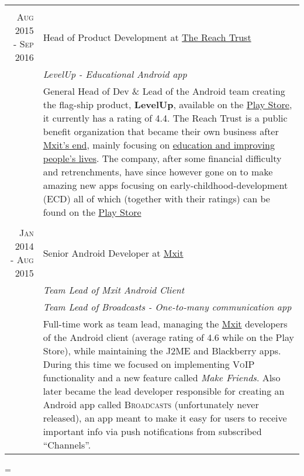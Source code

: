 \documentclass[a4paper,10pt,notitlepage]{article}
\newenvironment{absolutelynopagebreak}
  {\par\nobreak\vfil\penalty0\vfilneg
   \vtop\bgroup}
  {\par\xdef\tpd{\the\prevdepth}\egroup
   \prevdepth=\tpd}
\begin{document}
\begin{absolutelynopagebreak}
\begin{tabular}{r|p{11cm}}
		\multicolumn{2}{c}{} \\
		\textsc{Aug 2015 - Sep 2016} & Head of Product Development at \href{www.thereachtrust.org}{The Reach Trust} \\                                                                  &\emph{LevelUp -  Educational Android app} \\
		                            &\footnotesize{General Head of Dev \& Lead of the Android team creating the  flag-ship product, \textbf{LevelUp}, available on the \href{https://play.google.com/store/apps/details?id=org.mylevelup}{Play Store}, it currently has a rating of 4.4. The Reach Trust is a public benefit organization that became their own business after \href{https://memeburn.com/2015/10/mxit-confirms-its-shutting-up-shop/}{Mxit's end}, mainly focusing on \href{https://it-online.co.za/2015/10/26/reach-trust-will-use-mxit-for-education/}{education and improving people's lives}. The company, after some financial difficulty and retrenchments, have since however gone on to make amazing new apps focusing on early-childhood-development (ECD) all of which (together with their ratings) can be found on the \href{https://play.google.com/store/apps/dev?id=7356513661681471434}{Play Store}} \\
		 
		\multicolumn{2}{c}{} \\
		\textsc{Jan 2014 - Aug 2015} & Senior Android Developer at \href{www.mxit.com}{Mxit} \\
		                             & \emph{Team Lead of Mxit Android Client} \\
		                             & \emph{Team Lead of Broadcasts - One-to-many communication app} \\
		                             & \footnotesize{Full-time work as team lead, managing the \href{https://en.wikipedia.org/wiki/Mxit}{Mxit} developers of the Android client (average rating of 4.6 while on the Play Store), while maintaining the J2ME and Blackberry apps. During this time we focused on implementing \textsc{VoIP} functionality and a new feature called \textit{Make Friends}. Also later became the lead developer responsible for creating an Android app called \textsc{Broadcasts} (unfortunately never released), an app meant to make it easy for users to receive important info via push notifications from subscribed ``Channels''.} \\
		 

\end{tabular}
\end{absolutelynopagebreak}
\end{document}
